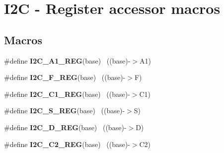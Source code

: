 \hypertarget{group___i2_c___register___accessor___macros}{}\section{I2\+C -\/ Register accessor macros}
\label{group___i2_c___register___accessor___macros}
\subsection*{Macros}
\begin{DoxyCompactItemize}
\item 
\hypertarget{group___i2_c___register___accessor___macros_gaf3e90bf855e545f82942bfb9207756a6}{}\#define {\bfseries I2\+C\+\_\+\+A1\+\_\+\+R\+E\+G}(base)                                              ~((base)-\/$>$A1)\label{group___i2_c___register___accessor___macros_gaf3e90bf855e545f82942bfb9207756a6}

\item 
\hypertarget{group___i2_c___register___accessor___macros_ga7aae8ba32e5e505c2db1bbc3b7c20213}{}\#define {\bfseries I2\+C\+\_\+\+F\+\_\+\+R\+E\+G}(base)                                                ~((base)-\/$>$F)\label{group___i2_c___register___accessor___macros_ga7aae8ba32e5e505c2db1bbc3b7c20213}

\item 
\hypertarget{group___i2_c___register___accessor___macros_ga339b4af5c87abf62ac1689a412de6253}{}\#define {\bfseries I2\+C\+\_\+\+C1\+\_\+\+R\+E\+G}(base)                                              ~((base)-\/$>$C1)\label{group___i2_c___register___accessor___macros_ga339b4af5c87abf62ac1689a412de6253}

\item 
\hypertarget{group___i2_c___register___accessor___macros_ga6731d8ddb2a07ae27efc7424ef7fb218}{}\#define {\bfseries I2\+C\+\_\+\+S\+\_\+\+R\+E\+G}(base)                                                ~((base)-\/$>$S)\label{group___i2_c___register___accessor___macros_ga6731d8ddb2a07ae27efc7424ef7fb218}

\item 
\hypertarget{group___i2_c___register___accessor___macros_gae63c8db26394d46c618decb6ce6dbf32}{}\#define {\bfseries I2\+C\+\_\+\+D\+\_\+\+R\+E\+G}(base)                                                ~((base)-\/$>$D)\label{group___i2_c___register___accessor___macros_gae63c8db26394d46c618decb6ce6dbf32}

\item 
\hypertarget{group___i2_c___register___accessor___macros_ga1b1cbd6dd49b0a63bf09270e7be600b3}{}\#define {\bfseries I2\+C\+\_\+\+C2\+\_\+\+R\+E\+G}(base)                                              ~((base)-\/$>$C2)\label{group___i2_c___register___accessor___macros_ga1b1cbd6dd49b0a63bf09270e7be600b3}


\end{DoxyCompactItemize}
